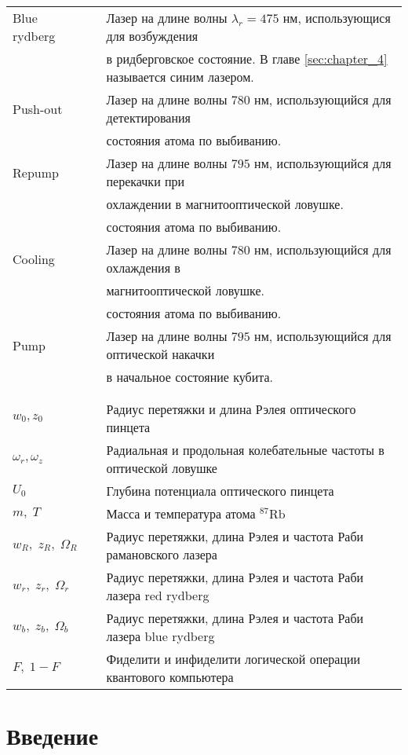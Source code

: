 \begin{tabular}{lll}
	Blue rydberg &    & Лазер на длине волны $\lambda_r = 475 \text{ нм}$, использующися для возбуждения \\
	& & в ридберговское состояние. В главе \ref{sec:chapter_4} называется синим лазером.\\
	Push-out &     & Лазер на длине волны $780 \text{ нм}$, использующийся для детектирования \\
	& & состояния атома по выбиванию. \\
	Repump &     & Лазер на длине волны $795 \text{ нм}$, использующийся для перекачки при \\ 
	& & охлаждении в магнитооптической ловушке. \\
	& & состояния атома по выбиванию. \\
	Cooling &     & Лазер на длине волны $780 \text{ нм}$, использующийся для охлаждения в \\
	& & магнитооптической ловушке. \\
	& & состояния атома по выбиванию. \\
	Pump &     & Лазер на длине волны $795 \text{ нм}$, использующийся для оптической накачки \\
	& & в начальное состояние кубита. \\
	& & \\
	& & \\
	$w_0, z_0$ &    & Радиус перетяжки и длина Рэлея оптического пинцета \\
	$\omega_r, \omega_z$ &    & Радиальная и продольная колебательные частоты в оптической ловушке \\
	$U_0$ &    & Глубина потенциала оптического пинцета \\
	$m, \; T$ &   & Масса и температура атома $^{87}\text{Rb}$ \\
	$w_{R}, \; z_{R}, \; \Omega_{R}$ &    & Радиус перетяжки, длина Рэлея и частота Раби рамановского лазера \\
	$w_{r}, \; z_{r}, \; \Omega_{r}$ &    & Радиус перетяжки, длина Рэлея и частота Раби лазера red rydberg\\
	$w_{b}, \; z_{b}, \; \Omega_{b}$ &    & Радиус перетяжки, длина Рэлея и частота Раби лазера blue rydberg\\
	$F, \; 1-F$ & & Фиделити и инфиделити логической операции квантового компьютера
\end{tabular}


\newpage


\section{Введение}
\label{sec:Introduction} 


